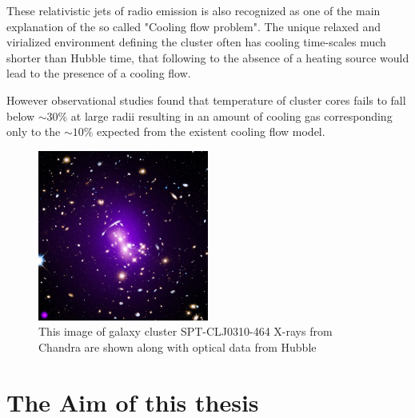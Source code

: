 These relativistic jets of radio emission is also recognized as one of the main explanation of the so called "Cooling flow problem". The unique relaxed and virialized environment defining the cluster often has cooling time-scales much shorter than Hubble time, that following to the absence of a heating source would lead to the presence of a cooling flow.

However observational studies found that temperature of cluster cores fails to fall below $\sim 30\%$ at large radii resulting in an amount of cooling gas corresponding only to the $\sim 10\%$ expected from the existent cooling flow model. \cite{David_2001}

\begin{figure}[t]
  \centering
  \includegraphics[width=0.5\textwidth]{BCG}
  \caption{This image of galaxy cluster SPT-CLJ0310-464
  X-rays from Chandra are shown along with optical data from Hubble}
  \label{1}
\end{figure}










\section{The Aim of this thesis}

